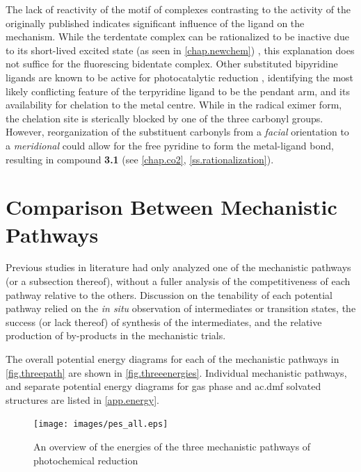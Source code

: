 The  lack of reactivity of the  motif of complexes contrasting to the activity of the originally published  indicates significant influence of the ligand on the mechanism. While the terdentate complex can be rationalized to be inactive due to its short-lived excited state (as seen in \autoref{chap.newchem}) \autocite{shavaleev2004}, this explanation does not suffice for the fluorescing bidentate complex. Other substituted bipyridine ligands are known to be active for photocatalytic reduction \autocite{hawecker1986, kurz2006}, identifying the most likely conflicting feature of the terpyridine ligand to be the pendant arm, and its availability for chelation to the metal centre. While in the radical eximer form, the chelation site is sterically blocked by one of the three carbonyl groups. However, reorganization of the substituent carbonyls from a \textit{facial} orientation to a \textit{meridional} could allow for the free pyridine to form the metal-ligand bond, resulting in compound \textbf{3.1} (see \autoref{chap.co2}, \autoref{ss.rationalization}).

\section{Comparison Between Mechanistic Pathways} \label{sec.compare}

Previous studies in literature had only analyzed one of the mechanistic pathways (or a subsection thereof), without a fuller analysis of the competitiveness of each pathway relative to the others. Discussion on the tenability of each potential pathway relied on the \textit{in situ} observation of intermediates or transition states, the success (or lack thereof) of synthesis of the intermediates, and the relative production of by-products in the mechanistic trials. 

The overall potential energy diagrams for each of the mechanistic pathways in \autoref{fig.threepath} are shown in \autoref{fig.threeenergies}. Individual mechanistic pathways, and separate potential energy diagrams for gas phase and \gls{ac.dmf} solvated structures are listed in \autoref{app.energy}.

\begin{figure}[!htbp]
 \begin{center}
  \texttt{[image: images/pes\_all.eps]}
 \end{center}
\caption[Reaction energies for three mechanistic pathways]{An overview of the energies of the three mechanistic pathways of photochemical  reduction}
\label{fig.threeenergies}
\end{figure} 

